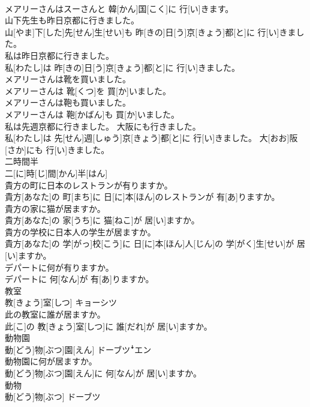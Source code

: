 \documentclass[8pt]{extreport}
\begin{document}
\begin{CJK}{UTF8}{min}
\\	メアリーさんはスーさんと 韓[かん]国[こく]に 行[い]きます。
\\	山下先生も昨日京都に行きました。	
\\	山[やま]下[した]先[せん]生[せい]も 昨[きの]日[う]京[きょう]都[と]に 行[い]きました。
\\	私は昨日京都に行きました。	
\\	私[わたし]は 昨[きの]日[う]京[きょう]都[と]に 行[い]きました。
\\	メアリーさんは靴を買いました。	
\\	メアリーさんは 靴[くつ]を 買[か]いました。
\\	メアリーさんは鞄も買いました。	
\\	メアリーさんは 鞄[かばん]も 買[か]いました。
\\	私は先週京都に行きました。 大阪にも行きました。	
\\	私[わたし]は 先[せん]週[しゅう]京[きょう]都[と]に 行[い]きました。 大[おお]阪[さか]にも 行[い]きました。
\\	二時間半	
\\	二[に]時[じ]間[かん]半[はん]
\\	貴方の町に日本のレストランが有りますか。	
\\	貴方[あなた]の 町[まち]に 日[に]本[ほん]のレストランが 有[あ]りますか。
\\	貴方の家に猫が居ますか。	
\\	貴方[あなた]の 家[うち]に 猫[ねこ]が 居[い]ますか。
\\	貴方の学校に日本人の学生が居ますか。	
\\	貴方[あなた]の 学[がっ]校[こう]に 日[に]本[ほん]人[じん]の 学[がく]生[せい]が 居[い]ますか。
\\	デパートに何が有りますか。	
\\	デパートに 何[なん]が 有[あ]りますか。
\\	教室	
\\	教[きょう]室[しつ]	キョーシツ
\\	此の教室に誰が居ますか。	
\\	此[こ]の 教[きょう]室[しつ]に 誰[だれ]が 居[い]ますか。
\\	動物園	
\\	動[どう]物[ぶつ]園[えん]	ドーブツꜜエン
\\	動物園に何が居ますか。	
\\	動[どう]物[ぶつ]園[えん]に 何[なん]が 居[い]ますか。
\\	動物	
\\	動[どう]物[ぶつ]	ドーブツ

\end{CJK}
\end{document}
